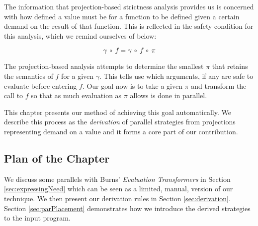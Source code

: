 The information that projection-based strictness analysis provides us is
concerned with how defined a value must be for a function to be defined given a
certain demand on the result of that function. This is reflected in the
safety condition for this analysis, which we remind ourselves of below:

\begin{equation}
\gamma \ \circ \ f = \gamma \ \circ \ f \ \circ \ \pi
\end{equation}

The projection-based analysis attempts to determine the smallest $\pi$ that
retains the semantics of $f$ for a given $\gamma$. This tells use which
arguments, if any are safe to evaluate before entering $f$. Our goal now is to
take a given $\pi$ and transform the call to $f$ so that as much evaluation as
$\pi$ allows is done in parallel.

This chapter presents our method of achieving this goal automatically. We
describe this process as the \emph{derivation} of parallel strategies from
projections representing demand on a value and it forms a core part of our
contribution.

\subsection*{Plan of the Chapter}

We discuss some parallels with Burns' \emph{Evaluation Transformers} in Section
\ref{sec:expressingNeed} which can be seen as a limited, manual, version of our
technique. We then present our derivation rules in Section
\ref{sec:derivation}.  Section \ref{sec:parPlacement} demonstrates how we
introduce the derived strategies to the input program.
